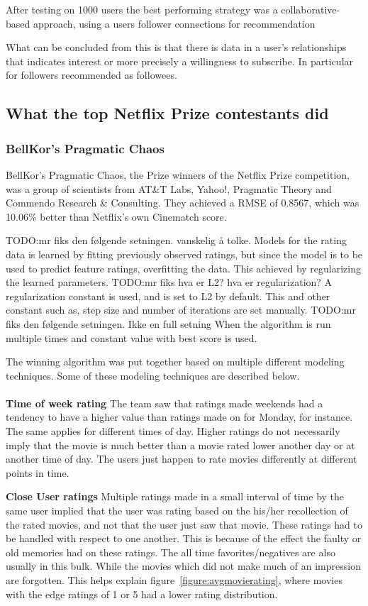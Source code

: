 After testing on 1000 users the best performing strategy was a collaborative-based approach, using a users follower connections for recommendation

What can be concluded from this is that there is data in a user's relationships that indicates interest or more precisely a willingness to subscribe. In particular for followers recommended as followees.


\subsection{What the top Netflix Prize contestants did}\label{subsec:thewinners}
\subsubsection{BellKor's Pragmatic Chaos}
BellKor's Pragmatic Chaos, the Prize winners of the Netflix Prize competition, was a group of scientists from AT\&T Labs, Yahoo!, Pragmatic Theory and Commendo Research \& Consulting. They achieved a RMSE of 0.8567, which was 10.06\% better than Netflix's own Cinematch score.

TODO:mr fiks den følgende setningen. vanskelig å tolke.
Models for the rating data is learned by fitting previously observed ratings, but since the model is to be used to predict feature ratings, overfitting the data. This achieved by regularizing the learned parameters.
TODO:mr fiks hva er L2? hva er regularization?
A regularization constant is used, and is set to L2 by default. This and other constant such as, step size and number of iterations are set manually.
TODO:mr fiks den følgende setningen. Ikke en full setning
When the algorithm is run multiple times and constant value with best score is used. \cite{BellKor-CF-TD}

The winning algorithm was put together based on multiple different modeling techniques. Some of these modeling techniques are described below. \\\\


\textbf{Time of week rating}  The team saw that ratings made weekends had a tendency to have a higher value than ratings made on for Monday, for instance. The same applies for different times of day. Higher ratings do not necessarily imply that the movie is much better than a movie rated lower another day or at another time of day. The users just happen to rate movies differently at different points in time.

\textbf{Close User ratings} Multiple ratings made in a small interval of time by the same user implied that the user was rating based on the his/her recollection of the rated movies, and not that the user just saw that movie. These ratings had to be handled with respect to one another. This is because of the effect the faulty or old memories had on these ratings. The all time favorites/negatives are also usually in this bulk. While the movies which did not make much of an impression are forgotten. This helps explain figure~\ref{figure:avgmovierating}, where movies with the edge ratings of 1 or 5 had a lower rating distribution.

